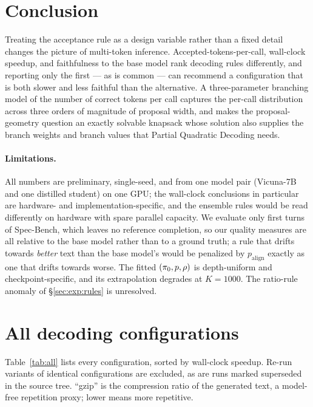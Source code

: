 \documentclass{article} %
\makeatletter
\newenvironment{ai}
  {\color{lightgray}%
   \@ifpackageloaded{caption}{\captionsetup{font={color=lightgray}}}{}%
   \let\ai@savedfloatreset\@floatboxreset
   \g@addto@macro\@floatboxreset{\color{lightgray}}}
  {\global\let\@floatboxreset\ai@savedfloatreset}
\makeatother
\begin{document}
\begin{ai}
\section{Conclusion}

Treating the acceptance rule as a design variable rather than a fixed detail
changes the picture of multi-token inference. Accepted-tokens-per-call,
wall-clock speedup, and faithfulness to the base model rank decoding rules
differently, and reporting only the first --- as is common --- can recommend a
configuration that is both slower and less faithful than the alternative. A
three-parameter branching model of the number of correct tokens per call captures
the per-call distribution across three orders of magnitude of proposal width, and
makes the proposal-geometry question an exactly solvable knapsack whose solution
also supplies the branch weights and branch values that Partial Quadratic
Decoding needs.

\paragraph{Limitations.}
All numbers are preliminary, single-seed, and from one model pair
(Vicuna-7B and one distilled student) on one GPU; the wall-clock conclusions in
particular are hardware- and implementation-specific, and the ensemble rules
would be read differently on hardware with spare parallel capacity. We evaluate
only first turns of Spec-Bench, which leaves no reference completion, so our
quality measures are all relative to the base model rather than to a ground
truth; a rule that drifts towards \emph{better} text than the base model's would
be penalized by $p_{\mathrm{align}}$ exactly as one that drifts towards worse. The
fitted $(\pi_0, p, \rho)$ is depth-uniform and checkpoint-specific, and its
extrapolation degrades at $K = 1000$. The ratio-rule anomaly of
\S\ref{sec:exp:rules} is unresolved.
\end{ai}




\appendix
\section{All decoding configurations}

Table~\ref{tab:all} lists every configuration, sorted by wall-clock speedup.
Re-run variants of identical configurations are excluded, as are runs marked
superseded in the source tree. ``gzip'' is the compression ratio of the generated
text, a model-free repetition proxy; lower means more repetitive.

\begin{table}[h]
  \centering
  \caption{All $62$ decoding configurations, sorted by speedup. Preliminary.}
  \label{tab:all}
  \tiny
  
\end{table}
\end{document}

